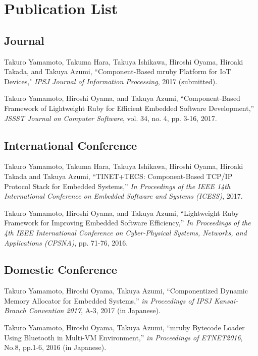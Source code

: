 \documentclass[a4j,12pt,oneside,openany,english]{jsbook}
\begin{document}



\chapter*{Publication List}
\section*{Journal}
\begin{enumerate}[{[}1{]}]
\item
    Takuro Yamamoto, Takuma Hara, Takuya Ishikawa, Hiroshi Oyama, Hiroaki Takada, and Takuya Azumi,
    ``Component-Based mruby Platform for IoT Devices,"
    \emph{IPSJ Journal of Information Processing},
    2017 (submitted).
\item
    Takuro Yamamoto, Hiroshi Oyama, and Takuya Azumi,
    ``Component-Based Framework of Lightweight Ruby for Efficient Embedded Software Development,''
    \emph{JSSST Journal on Computer Software},
    vol. 34, no. 4, pp. 3-16, 2017.
\end{enumerate}

\section*{International Conference}
\begin{enumerate}[{[}1{]}]
\item
    Takuro Yamamoto, Takuma Hara, Takuya Ishikawa, Hiroshi Oyama, Hiroaki Takada and Takuya Azumi,
    ``TINET+TECS: Component-Based TCP/IP Protocol Stack for Embedded Systems,''
    \emph{In Proceedings of the IEEE 14th International Conference on Embedded Software and Systems (ICESS)},
    2017.
\item
    Takuro Yamamoto, Hiroshi Oyama, and Takuya Azumi,
    ``Lightweight Ruby Framework for Improving Embedded Software Efficiency,''
    \emph{In Proceedings of the 4th IEEE International Conference on Cyber-Physical Systems, Networks, and Applications (CPSNA)},
    pp. 71-76, 2016.
\end{enumerate}

\section*{Domestic Conference}
\begin{enumerate}[{[}1{]}]
\item
    Takuro Yamamoto, Hiroshi Oyama, Takuya Azumi,
    ``Componentized Dynamic Memory Allocator for Embedded Systems,''
    \emph{in Proceedings of IPSJ Kansai-Branch Convention 2017},
    A-3, 2017 (in Japanese).
\item
    Takuro Yamamoto, Hiroshi Oyama, Takuya Azumi,
    ``mruby Bytecode Loader Using Bluetooth in Multi-VM Environment,''
    \emph{in Proceedings of ETNET2016},
    No.8, pp.1-6, 2016 (in Japanese).
\end{enumerate}
\end{document}
